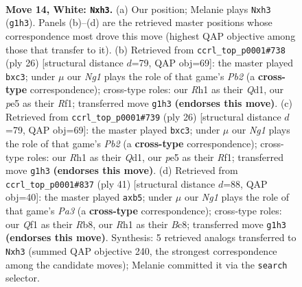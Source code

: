 \documentclass[11pt]{article}
\begin{document}
\clearpage

\begin{figure}[p]\centering
\begin{subfigure}{0.46\textwidth}\centering
\resizebox{\linewidth}{!}{%
\newchessgame
\chessboard[
  setfen={rn1qkbr1/5p2/3p1np1/2pPp3/4P3/2N1B2p/PP1K1P2/R4QNR w q - 0 14},
  showmover=false,
  pgfstyle=straightmove, color=movearrow, markmove={g1-h3}
]}
\caption{}
\end{subfigure}\hfill
\begin{subfigure}{0.46\textwidth}\centering
\resizebox{\linewidth}{!}{%
\newchessgame
\chessboard[
  setfen={r1bqkb1r/p4pp1/3p1n1p/2p5/4PB2/1PpP1N2/1P2N1PP/R2Q1R1K w kq - 0 14},
  showmover=false,
  pgfstyle=straightmove, color=movearrow, markmove={b2-c3}
]}
\caption{}
\end{subfigure}
\\[4pt]
\begin{subfigure}{0.46\textwidth}\centering
\resizebox{\linewidth}{!}{%
\newchessgame
\chessboard[
  setfen={r1bqkb1r/p4pp1/3p1n1p/2p5/4PB2/1PpP1N2/1P2N1PP/R2Q1R1K w kq - 0 14},
  showmover=false,
  pgfstyle=straightmove, color=movearrow, markmove={b2-c3}
]}
\caption{}
\end{subfigure}\hfill
\begin{subfigure}{0.46\textwidth}\centering
\resizebox{\linewidth}{!}{%
\newchessgame
\chessboard[
  setfen={1rb1r1k1/2qn1p1p/p2p2p1/1P2p3/4P3/1P4PP/2PQNPB1/R3R1K1 b - - 0 21},
  showmover=false,
  pgfstyle=straightmove, color=movearrow, markmove={a6-b5}
]}
\caption{}
\end{subfigure}
\caption{\textbf{Move 14, White: \texttt{Nxh3}.} (a) Our position; Melanie plays \texttt{Nxh3} (\texttt{g1h3}). Panels (b)--(d) are the retrieved master positions whose correspondence most drove this move (highest QAP objective among those that transfer to it). (b) Retrieved from \texttt{ccrl\_top\_p0001\#738} (ply 26) [structural distance $d$=79, QAP obj=69]: the master played \texttt{bxc3}; under $\mu$ our \emph{Ng1} plays the role of that game's \emph{Pb2} (a \textbf{cross-type} correspondence); cross-type roles: our \emph{R}h1 as their \emph{Q}d1, our \emph{p}e5 as their \emph{R}f1; transferred move \texttt{g1h3} \textbf{(endorses this move)}. (c) Retrieved from \texttt{ccrl\_top\_p0001\#739} (ply 26) [structural distance $d$=79, QAP obj=69]: the master played \texttt{bxc3}; under $\mu$ our \emph{Ng1} plays the role of that game's \emph{Pb2} (a \textbf{cross-type} correspondence); cross-type roles: our \emph{R}h1 as their \emph{Q}d1, our \emph{p}e5 as their \emph{R}f1; transferred move \texttt{g1h3} \textbf{(endorses this move)}. (d) Retrieved from \texttt{ccrl\_top\_p0001\#837} (ply 41) [structural distance $d$=88, QAP obj=40]: the master played \texttt{axb5}; under $\mu$ our \emph{Ng1} plays the role of that game's \emph{Pa3} (a \textbf{cross-type} correspondence); cross-type roles: our \emph{Q}f1 as their \emph{R}b8, our \emph{R}h1 as their \emph{B}c8; transferred move \texttt{g1h3} \textbf{(endorses this move)}. Synthesis: 5 retrieved analogs transferred to \texttt{Nxh3} (summed QAP objective 240, the strongest correspondence among the candidate moves); Melanie committed it via the \texttt{search} selector.}
\label{fig:thought-m26}
\end{figure}
\end{document}
